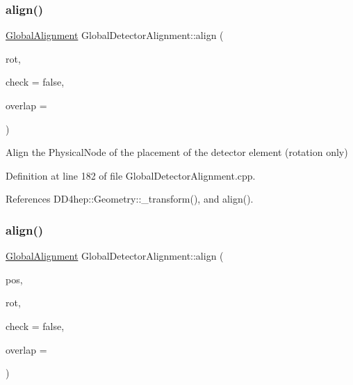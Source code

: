 \subsubsection{\texorpdfstring{align()}{align()}\hspace{0.1cm}{\footnotesize\ttfamily [2/10]}}
{\footnotesize\ttfamily \hyperlink{class_d_d4hep_1_1_alignments_1_1_global_alignment}{Global\+Alignment} Global\+Detector\+Alignment\+::align (\begin{DoxyParamCaption}\item[{const Rotation\+Z\+YX \&}]{rot,  }\item[{bool}]{check = {\ttfamily false},  }\item[{double}]{overlap = {} }\end{DoxyParamCaption})}



Align the Physical\+Node of the placement of the detector element (rotation only) 



Definition at line 182 of file Global\+Detector\+Alignment.\+cpp.



References D\+D4hep\+::\+Geometry\+::\+\_\+transform(), and align().

\hypertarget{class_d_d4hep_1_1_alignments_1_1_global_detector_alignment_a11e7e399711724497cb9321e74e3e345}{}\label{class_d_d4hep_1_1_alignments_1_1_global_detector_alignment_a11e7e399711724497cb9321e74e3e345} 
\subsubsection{\texorpdfstring{align()}{align()}\hspace{0.1cm}{\footnotesize\ttfamily [3/10]}}
{\footnotesize\ttfamily \hyperlink{class_d_d4hep_1_1_alignments_1_1_global_alignment}{Global\+Alignment} Global\+Detector\+Alignment\+::align (\begin{DoxyParamCaption}\item[{const Position \&}]{pos,  }\item[{const Rotation\+Z\+YX \&}]{rot,  }\item[{bool}]{check = {\ttfamily false},  }\item[{double}]{overlap = {} }\end{DoxyParamCaption})}



